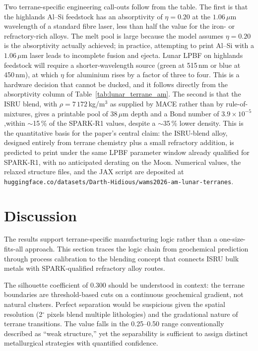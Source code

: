 \documentclass[11pt,a4paper]{article}
\begin{document}
Two terrane-specific engineering call-outs follow from the table. The first is that the highlands Al--Si feedstock has an absorptivity of $\eta = 0.20$ at the $1.06\,\mu$m wavelength of a standard fibre laser, less than half the value for the iron- or refractory-rich alloys. The melt pool is large because the model assumes $\eta = 0.20$ is the absorptivity actually achieved; in practice, attempting to print Al--Si with a $1.06\,\mu$m laser leads to incomplete fusion and ejecta. Lunar LPBF on highlands feedstock will require a shorter-wavelength source (green at 515\,nm or blue at 450\,nm), at which $\eta$ for aluminium rises by a factor of three to four. This is a hardware decision that cannot be ducked, and it follows directly from the absorptivity column of Table~\ref{tab:lunar_terrane_am}. The second is that the ISRU blend, with $\rho = 7\,172$\,kg/m$^3$ as supplied by MACE rather than by rule-of-mixtures, gives a printable pool of 38\,$\mu$m depth and a Bond number of $3.9 \times 10^{-5}$,within $\sim$15\,\% of the SPARK-R1 values, despite a $\sim$35\,\% lower density. This is the quantitative basis for the paper's central claim: the ISRU-blend alloy, designed entirely from terrane chemistry plus a small refractory addition, is predicted to print under the same LPBF parameter window already qualified for SPARK-R1, with no anticipated derating on the Moon. Numerical values, the relaxed structure files, and the JAX script are deposited at \texttt{huggingface.co/datasets/Darth-Hidious/wams2026-am-lunar-terranes}.

\section{Discussion}

The results support terrane-specific manufacturing logic rather than a one-size-fits-all approach. This section traces the logic chain from geochemical prediction through process calibration to the blending concept that connects ISRU bulk metals with SPARK-qualified refractory alloy routes.

The silhouette coefficient of 0.300 should be understood in context: the terrane boundaries are threshold-based cuts on a continuous geochemical gradient, not natural clusters. Perfect separation would be suspicious given the spatial resolution (2$^\circ$ pixels blend multiple lithologies) and the gradational nature of terrane transitions. The value falls in the 0.25--0.50 range conventionally described as ``weak structure,'' yet the separability is sufficient to assign distinct metallurgical strategies with quantified confidence.
\end{document}
